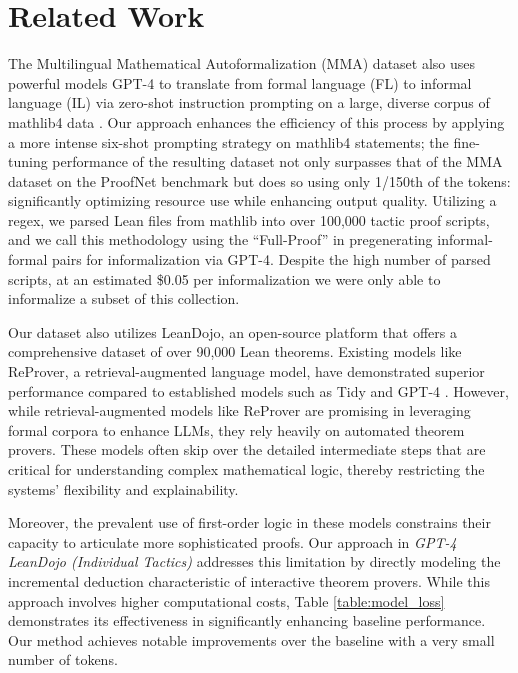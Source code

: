 \section{Related Work}
The Multilingual Mathematical Autoformalization (MMA) dataset also uses powerful models GPT-4 to translate from formal language (FL) to informal language (IL) via zero-shot instruction prompting on a large, diverse corpus of mathlib4 data \citep{mma}. Our approach enhances the efficiency of this process by applying a more intense six-shot prompting strategy on mathlib4 statements; the fine-tuning performance of the resulting dataset not only surpasses that of the MMA dataset on the ProofNet benchmark but does so using only 1/150th of the tokens: significantly optimizing resource use while enhancing output quality. Utilizing a regex, we parsed Lean files from mathlib into over 100,000 tactic proof scripts, and we call this methodology using the “Full-Proof” in pregenerating informal-formal pairs for informalization via GPT-4. Despite the high number of parsed scripts, at an estimated \$0.05 per informalization we were only able to informalize a subset of this collection.

Our dataset also utilizes LeanDojo, an open-source platform that offers a comprehensive dataset of over 90,000 Lean theorems. Existing models like ReProver, a retrieval-augmented language model, have demonstrated superior performance compared to established models such as Tidy and GPT-4 \citep{Leandojo}. However, while retrieval-augmented models like ReProver are promising in leveraging formal corpora to enhance LLMs, they rely heavily on automated theorem provers. These models often skip over the detailed intermediate steps that are critical for understanding complex mathematical logic, thereby restricting the systems' flexibility and explainability.

Moreover, the prevalent use of first-order logic in these models constrains their capacity to articulate more sophisticated proofs. Our approach in \textit{GPT-4 LeanDojo (Individual Tactics)} addresses this limitation by directly modeling the incremental deduction characteristic of interactive theorem provers. While this approach involves higher computational costs, Table \ref{table:model_loss} demonstrates its effectiveness in significantly enhancing baseline performance. Our method achieves notable improvements over the baseline with a very small number of tokens.
